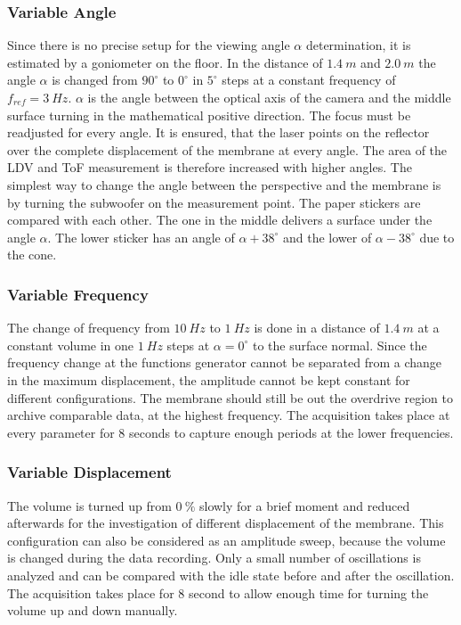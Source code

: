 \subsubsection{Variable Angle}   
Since there is no precise setup for the viewing angle $\alpha$ determination, it is estimated by a goniometer on the floor. In the distance of $1.4~m$ and $2.0~m$ the angle $\alpha$ is changed from $90^\circ$ to $0^\circ$ in $5^\circ$ steps at a constant frequency of $f_{ref}=3~Hz$. $\alpha$ is the angle between the optical axis of the camera and the  middle surface turning in the mathematical positive direction. The focus must be readjusted for every angle. It is ensured, that the laser points on the reflector over the complete displacement of the membrane at every angle. The area of the LDV and ToF measurement is therefore increased with higher angles. The simplest way to change the angle between the perspective and the membrane is by turning the subwoofer on the measurement point. The paper stickers are compared with each other. The one in the middle delivers a surface under the angle $\alpha$. The lower sticker has an angle of $\alpha + 38^\circ$ and the lower of $\alpha -38^\circ$ due to the cone. 

\subsubsection{Variable Frequency}
The change of frequency from $10~Hz$ to $1~Hz$ is done in a distance of $1.4~m$ at a constant volume in one $1~Hz$ steps at $\alpha = 0^\circ$ to the surface normal. Since the frequency change at the functions generator cannot be separated from a change in the maximum displacement, the amplitude cannot be kept constant for different configurations. The membrane should still be out the overdrive region to archive comparable data, at the highest frequency. The acquisition takes place at every parameter for 8 seconds to capture enough periods at the lower frequencies.     

\subsubsection{Variable Displacement}
The volume is turned up from $0~\%$ slowly for a brief moment and reduced afterwards for the investigation of different displacement of the membrane. This configuration can also be considered as an amplitude sweep, because the volume is changed during the data recording. Only a small number of oscillations is analyzed and can be compared with the idle state before and after the oscillation. The acquisition takes place for 8 second to allow enough time for turning the volume up and down manually. 

